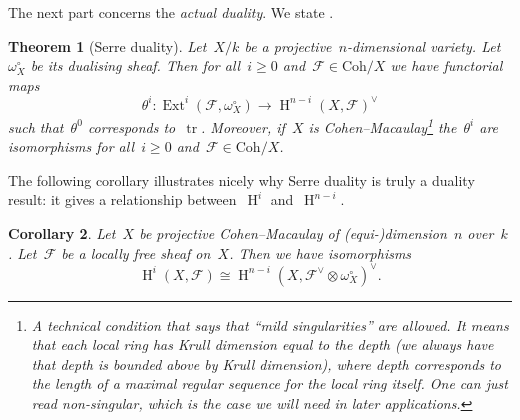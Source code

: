 \documentclass[10pt,a4paper]{article}
\theoremstyle{lecture}
\newtheorem{theorem}{Theorem}
\newtheorem{corollary}[theorem]{Corollary}
\newcommand\dash{\nobreakdash-\hspace{0pt}}
\newcommand\Coh{\ensuremath{\mathrm{Coh}}}
\DeclareMathOperator\Ext{Ext}
\DeclareMathOperator\HH{H}
\DeclareMathOperator\tr{tr}
\begin{document}
The next part concerns the \emph{actual duality}. We state \cite[proposition III.7.6]{hartshorne-algebraic-geometry}.
\begin{theorem}[Serre duality]
  \label{theorem:serre-duality}
  Let~$X/k$ be a projective~$n$\dash dimensional variety. Let~$\omega_X^\circ$ be its dualising sheaf. Then for all~$i\geq 0$ and~$\mathcal{F}\in\Coh/X$ we have functorial maps
  \begin{equation}
    \theta^i\colon\Ext^i(\mathcal{F},\omega_X^\circ)\to\HH^{n-i}(X,\mathcal{F})^\vee
  \end{equation}
  such that~$\theta^0$ corresponds to~$\tr$. Moreover, if~$X$ is Cohen--Macaulay\footnote{A technical condition that says that ``mild singularities'' are allowed. It means that each local ring has Krull dimension equal to the depth (we always have that depth is bounded above by Krull dimension), where depth corresponds to the length of a maximal regular sequence for the local ring itself. One can just read non-singular, which is the case we will need in later applications.} the~$\theta^i$ are isomorphisms for all~$i\geq 0$ and~$\mathcal{F}\in\Coh/X$.
\end{theorem}
The following corollary illustrates nicely why Serre duality is truly a duality result: it gives a relationship between~$\HH^i$ and~$\HH^{n-i}$.
\begin{corollary}
  Let~$X$ be projective Cohen--Macaulay of (equi-)dimension~$n$ over~$k$. Let~$\mathcal{F}$ be a locally free sheaf on~$X$. Then we have isomorphisms
  \begin{equation}
    \HH^i(X,\mathcal{F})\cong\HH^{n-i}(X,\mathcal{F}^\vee\otimes\omega_X^\circ)^\vee.
  \end{equation}
\end{corollary}
\end{document}
